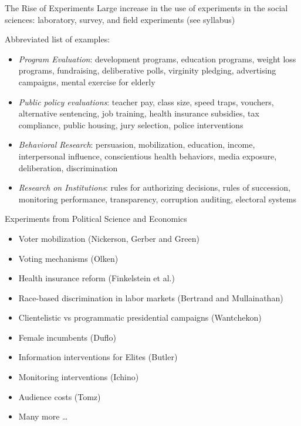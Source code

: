 \documentclass{beamer}
\numberwithin{equation}{section}
\begin{document}
\begin{frame}{The Rise of Experiments}
\small
Large increase in the use of experiments in the social sciences:
laboratory, survey, and field experiments (see syllabus)

Abbreviated list of examples:

\begin{itemize}
\itemsep1pt\parskip0pt
\item
  \emph{Program Evaluation}: development programs, education programs,
  weight loss programs, fundraising, deliberative polls, virginity
  pledging, advertising campaigns, mental exercise for elderly
\item
  \emph{Public policy evaluations}: teacher pay, class size, speed
  traps, vouchers, alternative sentencing, job training, health
  insurance subsidies, tax compliance, public housing, jury selection,
  police interventions 
\item
  \emph{Behavioral Research}: persuasion, mobilization, education,
  income, interpersonal influence, conscientious health behaviors, media
  exposure, deliberation, discrimination 
\item
  \emph{Research on Institutions}: rules for authorizing decisions,
  rules of succession, monitoring performance, transparency, corruption
  auditing, electoral systems
\end{itemize}

\end{frame}

\begin{frame}{Experiments from Political Science and Economics}

\begin{itemize}
\itemsep1pt\parskip0pt
\item
  Voter mobilization (Nickerson, Gerber and Green)
\item
  Voting mechanisms (Olken)
\item
  Health insurance reform (Finkelstein et al.)
\item
  Race-based discrimination in labor markets (Bertrand and Mullainathan)
\item
  Clientelistic vs programmatic presidential campaigns (Wantchekon)
\item
  Female incumbents (Duflo)
\item
  Information interventions for Elites (Butler)
\item
  Monitoring interventions (Ichino)
\item
  Audience costs (Tomz)
\item
  Many more \ldots{}
\end{itemize}

\end{frame}
\end{document}
